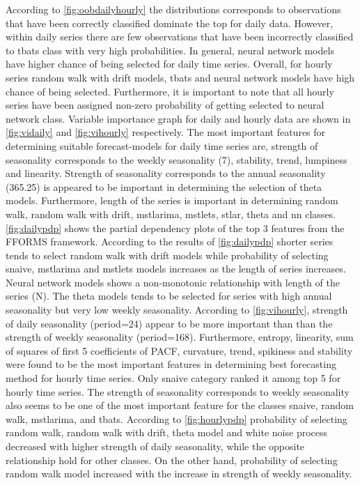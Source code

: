 \documentclass[11pt,a4paper,]{article}
\begin{document}
According to \autoref{fig:oobdailyhourly} the distributions corresponds
to observations that have been correctly classified dominate the top for
daily data. However, within daily series there are few observations that
have been incorrectly classified to tbats class with very high
probabilities. In general, neural network models have higher chance of
being selected for daily time series. Overall, for hourly series random
walk with drift models, tbats and neural network models have high chance
of being selected. Furthermore, it is important to note that all hourly
series have been assigned non-zero probability of getting selected to
neural network class. Variable importance graph for daily and hourly
data are shown in \autoref{fig:vidaily} and \autoref{fig:vihourly}
respectively. The most important features for determining suitable
forecast-models for daily time series are, strength of seasonality
corresponds to the weekly seasonality (7), stability, trend, lumpiness
and linearity. Strength of seasonality corresponds to the annual
seasonality (365.25) is appeared to be important in determining the
selection of theta models. Furthermore, length of the series is
important in determining random walk, random walk with drift, mstlarima,
mstlets, stlar, theta and nn classes. \autoref{fig:dailypdp} shows the
partial dependency plots of the top 3 features from the FFORMS
framework. According to the results of \autoref{fig:dailypdp} shorter
series tends to select random walk with drift models while probability
of selecting snaive, mstlarima and mstlets models increases as the
length of series increases. Neural network models shows a non-monotonic
relationship with length of the series (N). The theta models tends to be
selected for series with high annual seasonality but very low weekly
seasonality. According to \autoref{fig:vihourly}, strength of daily
seasonality (period=24) appear to be more important than than the
strength of weekly seasonality (period=168). Furthermore, entropy,
linearity, sum of squares of first 5 coefficients of PACF, curvature,
trend, spikiness and stability were found to be the most important
features in determining best forecasting method for hourly time series.
Only snaive category ranked it among top 5 for hourly time series. The
strength of seasonality corresponds to weekly seasonality also seems to
be one of the most important feature for the classes snaive, random
walk, mstlarima, and tbats. According to \autoref{fig:hourlypdp}
probability of selecting random walk, random walk with drift, theta
model and white noise process decreased with higher strength of daily
seasonality, while the opposite relationship hold for other classes. On
the other hand, probability of selecting random walk model increased
with the increase in strength of weekly seasonality.
\end{document}
